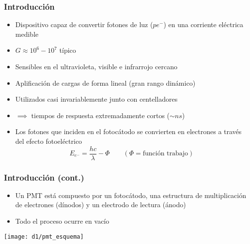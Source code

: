 \documentclass{beamer}
\begin{document}
\begin{frame}
\frametitle{Introducci\'on}
\begin{block}{}
\begin{itemize}
\item Dispositivo capaz de convertir fotones de luz ($pe^-$) en una corriente el\'ectrica
medible
\item $G \approx 10^6 - 10^7$ t\'ipico
\item Sensibles en el {\color{blue}ultravioleta, visible e infrarrojo cercano}
\item Aplificaci\'on de cargas de forma \alert{lineal} ({\color{blue}gran rango
din\'amico})
\item Utilizados casi invariablemente junto con {\color{blue}centelladores}
\item $\implies$ tiempos de respuesta extremadamente cortos ($\sim ns$)
\item Los fotones que inciden en el fotoc\'atodo se convierten en
electrones a trav\'es del \alert{efecto fotoel\'ectrico}
$$E_{e^-} = \frac{hc}{\lambda} - \Phi \qquad (\Phi = \text{funci\'on
trabajo})$$
\end{itemize}
\end{block}
\end{frame} 

\begin{frame}
\frametitle{Introducci\'on (cont.)}
\begin{itemize}
\item Un PMT est\'a compuesto por un \alert{fotoc\'atodo}, una
estructura de multiplicaci\'on de electrones (\alert{d\'inodos}) y un electrodo de
lectura (\alert{\'anodo})
\item Todo el proceso ocurre en vac\'io
\end{itemize}
\texttt{[image: d1/pmt\_esquema]}
\end{frame} 
\end{document}
